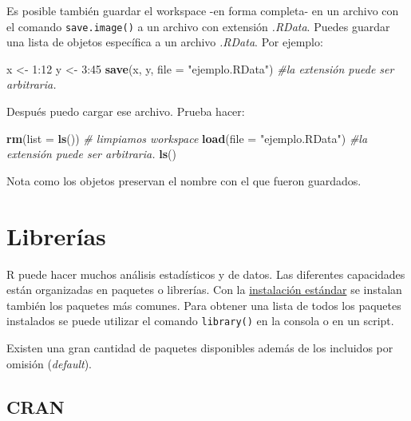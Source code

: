 \documentclass[]{article}
\newenvironment{Shaded}{\begin{snugshade}}{\end{snugshade}}
\newcommand{\KeywordTok}[1]{\textcolor[rgb]{0.13,0.29,0.53}{\textbf{{#1}}}}
\newcommand{\DataTypeTok}[1]{\textcolor[rgb]{0.13,0.29,0.53}{{#1}}}
\newcommand{\DecValTok}[1]{\textcolor[rgb]{0.00,0.00,0.81}{{#1}}}
\newcommand{\StringTok}[1]{\textcolor[rgb]{0.31,0.60,0.02}{{#1}}}
\newcommand{\CommentTok}[1]{\textcolor[rgb]{0.56,0.35,0.01}{\textit{{#1}}}}
\newcommand{\NormalTok}[1]{{#1}}
\begin{document}
Es posible también guardar el workspace -en forma completa- en un
archivo con el comando \texttt{save.image()} a un archivo con extensión
\emph{.RData}. Puedes guardar una lista de objetos específica a un
archivo \emph{.RData}. Por ejemplo:

\begin{Shaded}
\begin{Highlighting}[]
\NormalTok{x <-}\StringTok{ }\DecValTok{1}\NormalTok{:}\DecValTok{12}
\NormalTok{y <-}\StringTok{ }\DecValTok{3}\NormalTok{:}\DecValTok{45}
\KeywordTok{save}\NormalTok{(x, y, }\DataTypeTok{file =} \StringTok{"ejemplo.RData"}\NormalTok{) }\CommentTok{#la extensión puede ser arbitraria.}
\end{Highlighting}
\end{Shaded}

Después puedo cargar ese archivo. Prueba hacer:

\begin{Shaded}
\begin{Highlighting}[]
\KeywordTok{rm}\NormalTok{(}\DataTypeTok{list =} \KeywordTok{ls}\NormalTok{()) }\CommentTok{# limpiamos workspace}
\KeywordTok{load}\NormalTok{(}\DataTypeTok{file =} \StringTok{"ejemplo.RData"}\NormalTok{) }\CommentTok{#la extensión puede ser arbitraria.}
\KeywordTok{ls}\NormalTok{()}
\end{Highlighting}
\end{Shaded}

Nota como los objetos preservan el nombre con el que fueron guardados.

\section{Librerías}\label{librerias}

R puede hacer muchos análisis estadísticos y de datos. Las diferentes
capacidades están organizadas en paquetes o librerías. Con la
\href{https://github.com/animalito/aprendeR/blob/master/lecture_01/0_instalacion.pdf}{instalación
estándar} se instalan también los paquetes más comunes. Para obtener una
lista de todos los paquetes instalados se puede utilizar el comando
\texttt{library()} en la consola o en un script.

Existen una gran cantidad de paquetes disponibles además de los
incluidos por omisión (\emph{default}).

\subsection{CRAN}\label{cran}
\end{document}
